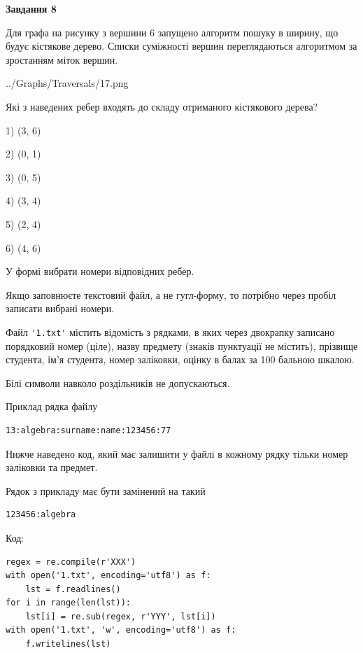 \documentclass[12pt, ukrainian]{article}
\def\code#1{\Verb!#1!}
\begin{document}
{\begin {large}
{\begin {center}\textbf{Завдання 8}\end {center}}\par
Для графа на рисунку з вершини 6 запущено алгоритм пошуку в ширину, що будує кістякове дерево. Списки суміжності вершин переглядаються алгоритмом за зростанням міток вершин.\par
\begin{center}
	{../Graphs/Traversals/17.png}
\end{center}
\par Які з наведених ребер входять до складу отриманого кістякового дерева?\par
1) (3, 6)\par
2) (0, 1)\par
3) (0, 5)\par
4) (3, 4)\par
5) (2, 4)\par
6) (4, 6)\par
{\vskip 15pt} У формі вибрати номери відповідних ребер.


Якщо заповнюєте текстовий файл, а не гугл-форму, то потрібно через пробіл записа\-ти вибрані номери.\par
\newpage


Файл \code{'1.txt'} містить відомість з рядками, в яких через двокрапку записано поряд\-ковий номер (ціле), назву предмету (знаків пунктуації не містить), прізвище студента, ім'я студента, номер заліковки, оцінку в балах за 100 бальною шкалою.

Білі символи навколо роздільників не допускаються.

Приклад рядка файлу



\begin{verbatim}
13:algebra:surname:name:123456:77
\end{verbatim}


Нижче наведено код, який має залишити у файлі в кожному рядку тільки номер заліковки та предмет.

Рядок з прикладу має бути замінений на такий



\begin{verbatim}
123456:algebra
\end{verbatim}




Код:



\begin{verbatim}
regex = re.compile(r'XXX')
with open('1.txt', encoding='utf8') as f:
    lst = f.readlines()
for i in range(len(lst)):
    lst[i] = re.sub(regex, r'YYY', lst[i])
with open('1.txt', 'w', encoding='utf8') as f:
    f.writelines(lst)
\end{verbatim}







\end{large}}
\end{document}
